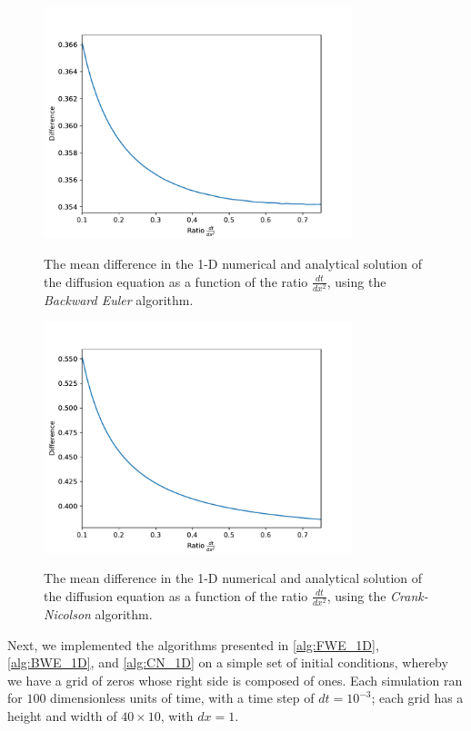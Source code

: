 \documentclass[a4paper,10pt,english]{article}
\begin{document}
\begin{figure}[H]
 \centering
  {\includegraphics[width=0.8\textwidth]{fig2_bwd.pdf}}
  \caption{The mean difference in the 1-D numerical and analytical solution of the diffusion equation as a function of the ratio $\frac{dt}{dx^2}$, using the \textit{Backward Euler} algorithm.\label{fig_9}}
\end{figure}

\begin{figure}[H]
 \centering
  {\includegraphics[width=0.8\textwidth]{fig2_cra.pdf}}
  \caption{The mean difference in the 1-D numerical and analytical solution of the diffusion equation as a function of the ratio $\frac{dt}{dx^2}$, using the \textit{Crank-Nicolson} algorithm.\label{fig_10}}
\end{figure}

Next, we implemented the algorithms presented in \ref{alg:FWE_1D}, \ref{alg:BWE_1D}, and \ref{alg:CN_1D} on a simple set of initial conditions, whereby we have a grid of zeros whose right side is composed of ones.  Each simulation ran for $100$ dimensionless units of time, with a time step of $dt = 10^{-3}$; each grid has a height and width of $40 \times 10$, with $dx = 1$.
\end{document}
